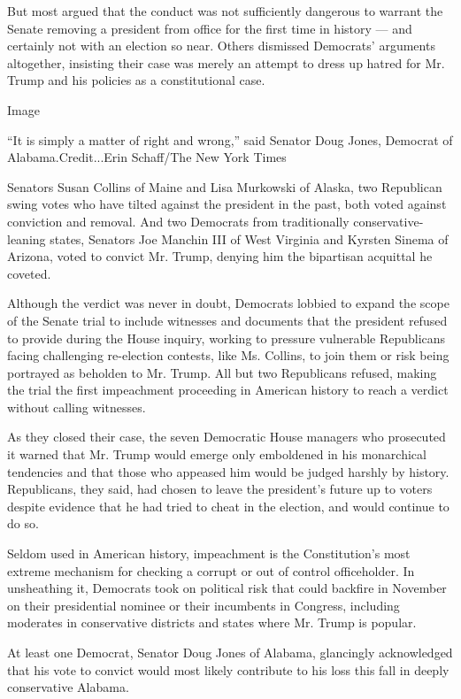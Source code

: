 But most argued that the conduct was not sufficiently dangerous to
warrant the Senate removing a president from office for the first time
in history --- and certainly not with an election so near. Others
dismissed Democrats' arguments altogether, insisting their case was
merely an attempt to dress up hatred for Mr. Trump and his policies as a
constitutional case.

Image

``It is simply a matter of right and wrong,'' said Senator Doug Jones,
Democrat of Alabama.Credit...Erin Schaff/The New York Times

Senators Susan Collins of Maine and Lisa Murkowski of Alaska, two
Republican swing votes who have tilted against the president in the
past, both voted against conviction and removal. And two Democrats from
traditionally conservative-leaning states, Senators Joe Manchin III of
West Virginia and Kyrsten Sinema of Arizona, voted to convict Mr. Trump,
denying him the bipartisan acquittal he coveted.

Although the verdict was never in doubt, Democrats lobbied to expand the
scope of the Senate trial to include witnesses and documents that the
president refused to provide during the House inquiry, working to
pressure vulnerable Republicans facing challenging re-election contests,
like Ms. Collins, to join them or risk being portrayed as beholden to
Mr. Trump. All but two Republicans refused, making the trial the first
impeachment proceeding in American history to reach a verdict without
calling witnesses.

As they closed their case, the seven Democratic House managers who
prosecuted it warned that Mr. Trump would emerge only emboldened in his
monarchical tendencies and that those who appeased him would be judged
harshly by history. Republicans, they said, had chosen to leave the
president's future up to voters despite evidence that he had tried to
cheat in the election, and would continue to do so.

Seldom used in American history, impeachment is the Constitution's most
extreme mechanism for checking a corrupt or out of control officeholder.
In unsheathing it, Democrats took on political risk that could backfire
in November on their presidential nominee or their incumbents in
Congress, including moderates in conservative districts and states where
Mr. Trump is popular.

At least one Democrat, Senator Doug Jones of Alabama, glancingly
acknowledged that his vote to convict would most likely contribute to
his loss this fall in deeply conservative Alabama.

